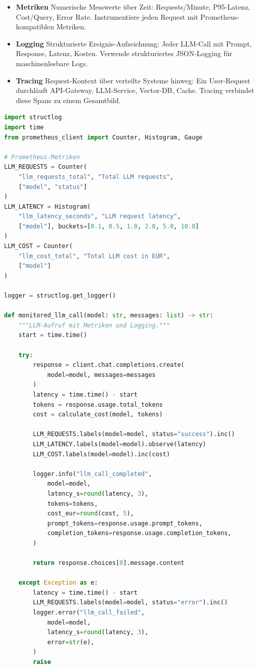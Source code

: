 \begin{itemize}

    \item \textbf{Metriken} Numerische Messwerte über Zeit: Requests/Minute, P95-Latenz, Cost/Query, Error Rate. Instrumentiere jeden Request mit Prometheus-kompatiblen Metriken.
    \item \textbf{Logging} Strukturierte Ereignis-Aufzeichnung: Jeder LLM-Call mit Prompt, Response, Latenz, Kosten. Verwende strukturiertes JSON-Logging für maschinenlesbare Logs.
    \item \textbf{Tracing} Request-Kontext über verteilte Systeme hinweg: Ein User-Request durchläuft API-Gateway, LLM-Service, Vector-DB, Cache. Tracing verbindet diese Spans zu einem Gesamtbild.
\end{itemize}

\begin{lstlisting}[language=Python, caption=Strukturiertes Logging mit Metriken für Prometheus]
import structlog
import time
from prometheus_client import Counter, Histogram, Gauge

# Prometheus-Metriken
LLM_REQUESTS = Counter(
    "llm_requests_total", "Total LLM requests",
    ["model", "status"]
)
LLM_LATENCY = Histogram(
    "llm_latency_seconds", "LLM request latency",
    ["model"], buckets=[0.1, 0.5, 1.0, 2.0, 5.0, 10.0]
)
LLM_COST = Counter(
    "llm_cost_total", "Total LLM cost in EUR",
    ["model"]
)

logger = structlog.get_logger()

def monitored_llm_call(model: str, messages: list) -> str:
    """LLM-Aufruf mit Metriken und Logging."""
    start = time.time()

    try:
        response = client.chat.completions.create(
            model=model, messages=messages
        )
        latency = time.time() - start
        tokens = response.usage.total_tokens
        cost = calculate_cost(model, tokens)

        LLM_REQUESTS.labels(model=model, status="success").inc()
        LLM_LATENCY.labels(model=model).observe(latency)
        LLM_COST.labels(model=model).inc(cost)

        logger.info("llm_call_completed",
            model=model,
            latency_s=round(latency, 3),
            tokens=tokens,
            cost_eur=round(cost, 5),
            prompt_tokens=response.usage.prompt_tokens,
            completion_tokens=response.usage.completion_tokens,
        )

        return response.choices[0].message.content

    except Exception as e:
        latency = time.time() - start
        LLM_REQUESTS.labels(model=model, status="error").inc()
        logger.error("llm_call_failed",
            model=model,
            latency_s=round(latency, 3),
            error=str(e),
        )
        raise
\end{lstlisting}

